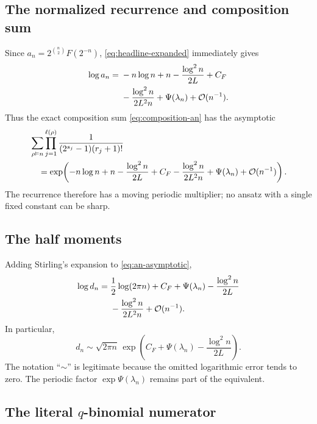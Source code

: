 \documentclass[11pt,oneside]{article}
\theoremstyle{definition}
\theoremstyle{remark}
\newcommand{\bigO}{\mathcal O}
\begin{document}
\subsection{The normalized recurrence and composition sum}

Since $a_n=2^{\binom n2}F(2^{-n})$, \eqref{eq:headline-expanded} immediately gives
\begin{align}
 \log a_n={}&-n\log n+n-\frac{\log^2n}{2L}+C_F             \notag\\
 &-\frac{\log^2n}{2L^2n}+\Psi(\lambda_n)+\bigO(n^{-1}).   \label{eq:an-asymptotic}
\end{align}
Thus the exact composition sum \eqref{eq:composition-an} has the asymptotic
\begin{align}
 &\sum_{\rho\vDash n}
 \prod_{j=1}^{\ell(\rho)}
 \frac{1}{(2^{s_j}-1)(r_j+1)!}                             \notag\\
 &\quad=\exp\!\left(
 -n\log n+n-\frac{\log^2n}{2L}+C_F
 -\frac{\log^2n}{2L^2n}+\Psi(\lambda_n)
 +\bigO(n^{-1})\right).                                    \label{eq:composition-asymptotic}
\end{align}
The recurrence therefore has a moving periodic multiplier; no ansatz with a single fixed
constant can be sharp.

\subsection{The half moments}

Adding Stirling's expansion to \eqref{eq:an-asymptotic},
\begin{align}
 \log d_n={}&\frac12\log(2\pi n)+C_F+\Psi(\lambda_n)
 -\frac{\log^2n}{2L}                                      \notag\\
 &-\frac{\log^2n}{2L^2n}+\bigO(n^{-1}).                   \label{eq:dn-asymptotic}
\end{align}
In particular,
\begin{equation}
 d_n\sim\sqrt{2\pi n}\,
 \exp\!\left(C_F+\Psi(\lambda_n)-\frac{\log^2n}{2L}\right).
                                                                    \label{eq:dn-equivalent}
\end{equation}
The notation ``$\sim$'' is legitimate because the omitted logarithmic error tends to zero.
The periodic factor $\exp\Psi(\lambda_n)$ remains part of the equivalent.

\subsection{The literal \texorpdfstring{$q$}{q}-binomial numerator}
\end{document}
